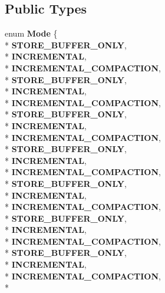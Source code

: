 \subsection*{Public Types}
\begin{DoxyCompactItemize}
\item 
enum {\bfseries Mode} \{ \\*
{\bfseries S\+T\+O\+R\+E\+\_\+\+B\+U\+F\+F\+E\+R\+\_\+\+O\+N\+LY}, 
\\*
{\bfseries I\+N\+C\+R\+E\+M\+E\+N\+T\+AL}, 
\\*
{\bfseries I\+N\+C\+R\+E\+M\+E\+N\+T\+A\+L\+\_\+\+C\+O\+M\+P\+A\+C\+T\+I\+ON}, 
\\*
{\bfseries S\+T\+O\+R\+E\+\_\+\+B\+U\+F\+F\+E\+R\+\_\+\+O\+N\+LY}, 
\\*
{\bfseries I\+N\+C\+R\+E\+M\+E\+N\+T\+AL}, 
\\*
{\bfseries I\+N\+C\+R\+E\+M\+E\+N\+T\+A\+L\+\_\+\+C\+O\+M\+P\+A\+C\+T\+I\+ON}, 
\\*
{\bfseries S\+T\+O\+R\+E\+\_\+\+B\+U\+F\+F\+E\+R\+\_\+\+O\+N\+LY}, 
\\*
{\bfseries I\+N\+C\+R\+E\+M\+E\+N\+T\+AL}, 
\\*
{\bfseries I\+N\+C\+R\+E\+M\+E\+N\+T\+A\+L\+\_\+\+C\+O\+M\+P\+A\+C\+T\+I\+ON}, 
\\*
{\bfseries S\+T\+O\+R\+E\+\_\+\+B\+U\+F\+F\+E\+R\+\_\+\+O\+N\+LY}, 
\\*
{\bfseries I\+N\+C\+R\+E\+M\+E\+N\+T\+AL}, 
\\*
{\bfseries I\+N\+C\+R\+E\+M\+E\+N\+T\+A\+L\+\_\+\+C\+O\+M\+P\+A\+C\+T\+I\+ON}, 
\\*
{\bfseries S\+T\+O\+R\+E\+\_\+\+B\+U\+F\+F\+E\+R\+\_\+\+O\+N\+LY}, 
\\*
{\bfseries I\+N\+C\+R\+E\+M\+E\+N\+T\+AL}, 
\\*
{\bfseries I\+N\+C\+R\+E\+M\+E\+N\+T\+A\+L\+\_\+\+C\+O\+M\+P\+A\+C\+T\+I\+ON}, 
\\*
{\bfseries S\+T\+O\+R\+E\+\_\+\+B\+U\+F\+F\+E\+R\+\_\+\+O\+N\+LY}, 
\\*
{\bfseries I\+N\+C\+R\+E\+M\+E\+N\+T\+AL}, 
\\*
{\bfseries I\+N\+C\+R\+E\+M\+E\+N\+T\+A\+L\+\_\+\+C\+O\+M\+P\+A\+C\+T\+I\+ON}, 
\\*
{\bfseries S\+T\+O\+R\+E\+\_\+\+B\+U\+F\+F\+E\+R\+\_\+\+O\+N\+LY}, 
\\*
{\bfseries I\+N\+C\+R\+E\+M\+E\+N\+T\+AL}, 
\\*
{\bfseries I\+N\+C\+R\+E\+M\+E\+N\+T\+A\+L\+\_\+\+C\+O\+M\+P\+A\+C\+T\+I\+ON}, 
\\*

\end{DoxyCompactItemize}
